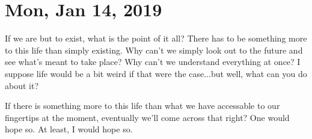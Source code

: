 \section{Mon, Jan 14, 2019}

If we are but to exist, what is the point of it all? There has to be something more
to this life than simply existing. Why can't we simply look out to the future and see
what's meant to take place? Why can't we understand everything at once? I suppose
life would be a bit weird if that were the case...but well, what can you do about it?

If there is something more to this life than what we have accessable to our
fingertips at the moment, eventually we'll come across that right? One would hope so.
At least, I would hope so.